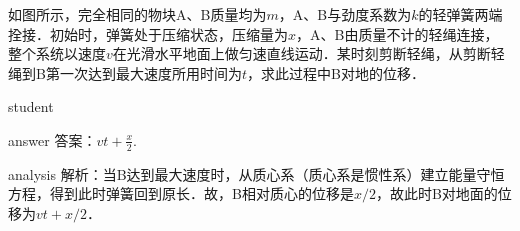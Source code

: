 \begin{example}
	如图所示，完全相同的物块A、B质量均为$ m $，A、B与劲度系数为$ k $的轻弹簧两端拴接．初始时，弹簧处于压缩状态，压缩量为$ x $，A、B由质量不计的轻绳连接，整个系统以速度$ v $在光滑水平地面上做匀速直线运动．某时刻剪断轻绳，从剪断轻绳到B第一次达到最大速度所用时间为$ t $，求此过程中B对地的位移．
	
	\begin{taggedblock}{student}
		\vspace*{2cm}
	\end{taggedblock}
	
	
	\begin{taggedblock}{answer}
		答案：$ vt+\frac{x}{2} $.
	\end{taggedblock}
	
	
	\begin{taggedblock}{analysis}
		解析：当B达到最大速度时，从质心系（质心系是惯性系）建立能量守恒方程，得到此时弹簧回到原长．故，B相对质心的位移是$ x/2 $，故此时B对地面的位移为$ vt+x/2 $．
	\end{taggedblock}
\end{example}

